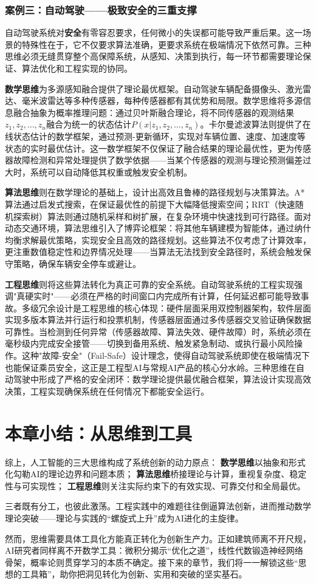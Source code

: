 \subsubsection{案例三：自动驾驶——极致安全的三重支撑}

自动驾驶系统对\textbf{安全}有零容忍要求，任何微小的失误都可能导致严重后果。这一场景的特殊性在于，它不仅要求算法准确，更要求系统在极端情况下依然可靠。三种思维必须无缝贯穿整个高保障系统，从感知、决策到执行，每一环节都需要理论保证、算法优化和工程实现的协同。

\textbf{数学思维}为多源感知融合提供了理论最优框架。自动驾驶车辆配备摄像头、激光雷达、毫米波雷达等多种传感器，每种传感器都有其优势和局限。数学思维将多源信息融合抽象为概率推理问题：通过贝叶斯融合理论，将不同传感器的观测结果$z_1, z_2, \ldots, z_n$融合为统一的状态估计$P(x|z_1, z_2, \ldots, z_n)$。卡尔曼滤波算法则提供了在线状态估计的数学框架，通过预测-更新循环，实现对车辆位置、速度、加速度等状态的实时最优估计。这一数学框架不仅保证了融合结果的理论最优性，更为传感器故障检测和异常处理提供了数学依据——当某个传感器的观测与理论预测偏差过大时，系统可以自动降低其权重或触发安全机制。

\textbf{算法思维}则在数学理论的基础上，设计出高效且鲁棒的路径规划与决策算法。A*算法通过启发式搜索，在保证最优性的前提下大幅降低搜索空间；RRT（快速随机探索树）算法则通过随机采样和树扩展，在复杂环境中快速找到可行路径。面对动态交通环境，算法思维引入了博弈论框架：将其他车辆建模为智能体，通过纳什均衡求解最优策略，实现安全且高效的路径规划。这些算法不仅考虑了计算效率，更注重数值稳定性和边界情况处理——当算法无法找到安全路径时，系统会触发保守策略，确保车辆安全停车或避让。

\textbf{工程思维}则将这些算法转化为真正可靠的安全系统。自动驾驶系统的工程实现强调"真硬实时"——必须在严格的时间窗口内完成所有计算，任何延迟都可能导致事故。多级冗余设计是工程思维的核心体现：硬件层面采用双控制器架构，软件层面实现多版本算法并行运行和投票机制，传感器层面通过多传感器交叉验证确保数据可靠性。当检测到任何异常（传感器故障、算法失效、硬件故障）时，系统必须在毫秒级内完成安全接管——切换到备用系统、触发紧急制动、或执行最小风险操作。这种"故障-安全"（Fail-Safe）设计理念，使得自动驾驶系统即使在极端情况下也能保证乘员安全，这正是工程型AI与常规AI产品的核心分水岭。三种思维在自动驾驶中形成了严格的安全闭环：数学理论提供最优融合框架，算法设计实现高效决策，工程实现确保系统在任何情况下都能安全运行。

\section{本章小结：从思维到工具}

综上，人工智能的三大思维构成了系统创新的动力原点：
\textbf{数学思维}以抽象和形式化勾勒AI的理论边界和问题本质；
\textbf{算法思维}桥接理论与计算，重视复杂度、稳定性与可实现性；
\textbf{工程思维}则关注实际约束下的有效实现、可靠交付和全局最优。

三者既有分工，也彼此激荡。工程实践中的难题往往倒逼算法创新，进而推动数学理论突破——理论与实践的“螺旋式上升”成为AI进化的主旋律。

然而，思维需要具体工具化方能真正转化为创新生产力。正如建筑师离不开尺规，AI研究者同样离不开数学工具：微积分揭示“优化之道”，线性代数锻造神经网络骨架，概率论则贯穿学习的本质不确定。接下来的章节，我们将一一解锁这些“思想的工具箱”，助你把洞见转化为创新、实用和突破的坚实基石。
